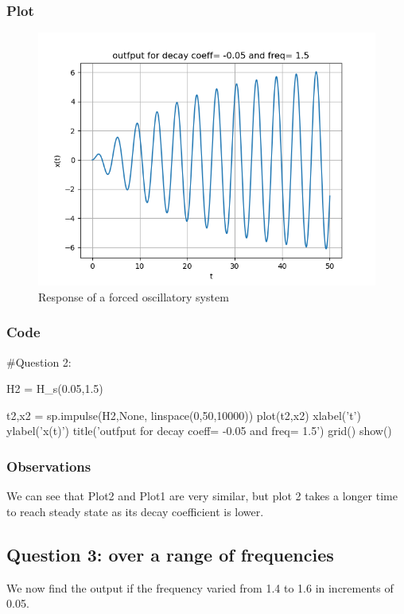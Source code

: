 \documentclass[11pt]{article}
\begin{document}
\subsubsection{Plot}
\begin{figure}[H]
    \centering
    \includegraphics[scale = 1]{Figure_2.png}
    \caption{Response of a forced oscillatory system}
\end{figure}

\subsubsection{Code}
\begin{python}
#Question 2:

H2 = H_s(0.05,1.5)

t2,x2 = sp.impulse(H2,None, linspace(0,50,10000))
plot(t2,x2)
xlabel('t')
ylabel('x(t)')
title('outfput for decay coeff= -0.05 and freq= 1.5')
grid()
show()
\end{python}

\subsubsection{Observations}
We can see that Plot2 and Plot1 are very similar, but plot 2 takes a longer time to reach steady state as its decay coefficient is lower.


\subsection{Question 3: over a range of frequencies}
We now find the output if the frequency varied from 1.4 to 1.6 in increments of 0.05.
\end{document}
